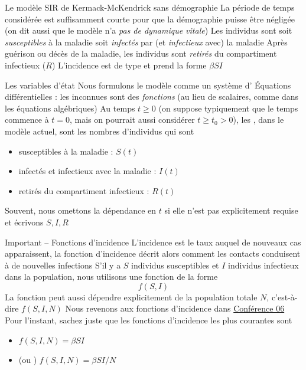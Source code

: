 \documentclass[aspectratio=169]{beamer}\usepackage[]{graphicx}\usepackage[]{xcolor}
\begin{document}



\begin{frame}{Le modèle SIR de Kermack-McKendrick sans démographie}
\bbullet La période de temps considérée est suffisamment courte pour que la démographie puisse être négligée (on dit aussi que le modèle n'a \emph{pas de dynamique vitale})
\vfill
\bbullet Les individus sont soit \emph{susceptibles} à la maladie soit \emph{infectés} par (et \emph{infectieux} avec) la maladie
\vfill
\bbullet Après guérison ou décès de la maladie, les individus sont \emph{retirés} du compartiment infectieux ($R$)
\vfill
\bbullet L'incidence est de type  et prend la forme $\beta SI$
\end{frame}


\begin{frame}{Les variables d'état}
Nous formulons le modèle comme un système d'
\vfill
Équations différentielles : les inconnues sont des \emph{fonctions} (au lieu de scalaires, comme dans les équations algébriques)
\vfill
Au temps $t\geq 0$ (on suppose typiquement que le temps commence à $t=0$, mais on pourrait aussi considérer $t\geq t_0>0$), les , dans le modèle actuel, sont les nombres d'individus qui sont
\begin{itemize}
\item susceptibles à la maladie : $S(t)$
\item infectés et infectieux avec la maladie : $I(t)$
\item retirés du compartiment infectieux : $R(t)$
\end{itemize}
\vfill
Souvent, nous omettons la dépendance en $t$ si elle n'est pas explicitement requise et écrivons $S,I,R$
\end{frame}



\begin{frame}{Important -- Fonctions d'incidence}
L'incidence est le taux auquel de nouveaux cas apparaissent, la fonction d'incidence décrit alors comment les contacts conduisent à de nouvelles infections
\vfill
S'il y a $S$ individus susceptibles et $I$ individus infectieux dans la population, nous utilisons une fonction de la forme
\[
f(S,I)
\]
La fonction peut aussi dépendre explicitement de la population totale $N$, c'est-à-dire $f(S,I,N)$
\vfill
Nous revenons aux fonctions d'incidence dans \href{no.se}{Conférence 06}
\vfill
Pour l'instant, sachez juste que les fonctions d'incidence les plus courantes sont
\begin{itemize}
\item {} $f(S,I,N)=\beta SI$
\item {} (ou ) $f(S,I,N)=\beta SI/N$
\end{itemize}
\end{frame}
\end{document}
